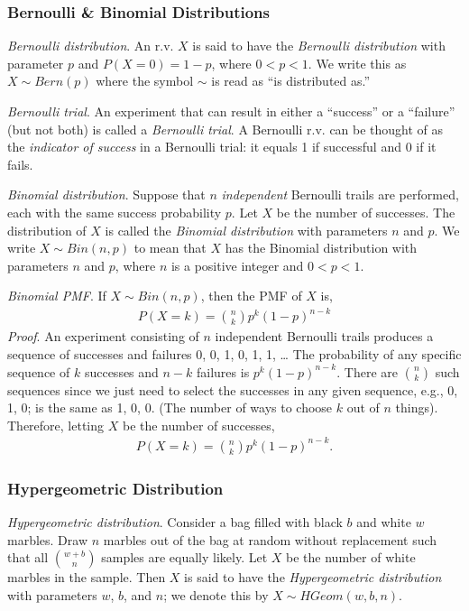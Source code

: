 \documentclass[11pt,a4paper]{article}
\begin{document}
\subsubsection{Bernoulli \& Binomial Distributions}

\emph{Bernoulli distribution}. 
An r.v. \(X\) is said to have the \emph{Bernoulli distribution} 
with parameter \(p\) and \(P(X = 0) = 1 - p\), 
where \(0 < p < 1\). 
We write this as \(X \sim Bern(p)\) 
where the symbol \(\sim\) is read as ``is distributed as.''

\emph{Bernoulli trial}. 
An experiment that can result in either a ``success'' 
or a ``failure'' (but not both) is called a \emph{Bernoulli trial}. 
A Bernoulli r.v. can be thought of as the \emph{indicator of success} in a Bernoulli trial: 
it equals 1 if successful and 0 if it fails.

\emph{Binomial distribution}. 
Suppose that \(n\) \emph{independent} Bernoulli trails are performed, 
each with the same success probability \(p\). 
Let \(X\) be the number of successes. 
The distribution of \(X\) is called the \emph{Binomial distribution} with parameters \(n\) and \(p\). 
We write \(X \sim Bin(n,p)\) to mean that \(X\) has the
Binomial distribution with parameters \(n\) and \(p\), 
where \(n\) is a positive integer and \(0 < p < 1\).

\emph{Binomial PMF}. 
If \(X \sim Bin(n,p)\), 
then the PMF of \(X\) is,
\begin{align}
P(X = k) = \binom{n}{k}p^{k}(1 - p)^{n - k}
\end{align}
\emph{Proof}. 
An experiment consisting of \(n\) independent Bernoulli
trails produces a sequence of successes and failures 0, 0, 1, 0, 1, 1, \ldots{} 
The probability of any specific sequence of \(k\) successes and \(n - k\) failures is \(p^{k}(1 - p)^{n - k}\). 
There are \(\binom{n}{k}\) such sequences since we just need to select the
successes in any given sequence, e.g., 0, 1, 0; is the same as 1, 0, 0.
(The number of ways to choose \(k\) out of \(n\) things). 
Therefore, letting \(X\) be the number of successes,
\begin{align}
P(X = k) = \binom{n}{k}p^{k}(1 - p)^{n - k}.
\end{align}

\subsubsection{Hypergeometric Distribution}

\emph{Hypergeometric distribution}. 
Consider a bag filled with black \(b\) and white \(w\) marbles. 
Draw \(n\) marbles out of the bag at random without 
replacement such that all \(\binom{w + b}{n}\) samples are equally likely. 
Let \(X\) be the number of white marbles in the sample. 
Then \(X\) is said to have the \emph{Hypergeometric distribution} 
with parameters \(w\), \(b\), and \(n\); 
we denote this by \(X \sim HGeom(w,b,n)\).
\end{document}
